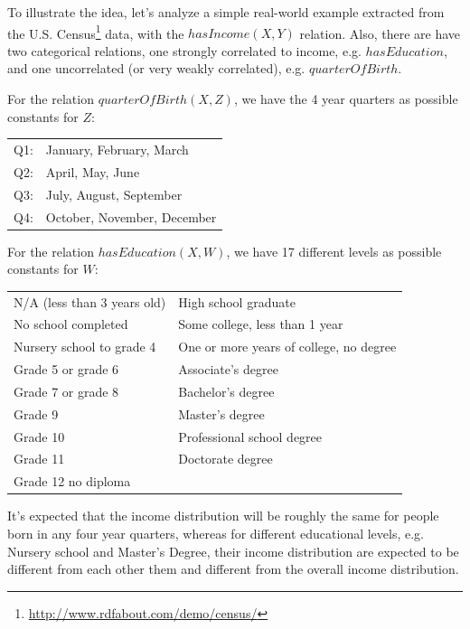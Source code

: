 To illustrate the idea, let's analyze a simple real-world example extracted from the U.S.
Census\footnote{\url{http://www.rdfabout.com/demo/census/}} data, with the $hasIncome(X,Y)$ relation. Also, there are
have two categorical relations, one strongly correlated to income, e.g. $hasEducation$, and one uncorrelated (or very
weakly correlated), e.g. $quarterOfBirth$.

For the relation $quarterOfBirth(X,Z)$, we have the 4 year quarters as possible constants for $Z$:

\begin{center}
  \begin{tabular}{r l}
    Q1:& January, February, March \\
    Q2:& April, May, June \\
    Q3:& July, August, September \\
    Q4:& October, November, December \\
  \end{tabular}
\end{center}

For the relation $hasEducation(X,W)$, we have 17 different levels as possible constants for $W$:

\begin{center}
  \begin{tabular}{l l}
    N/A (less than 3 years old) 	&High school graduate                 		\\
    No school completed			&Some college, less than 1 year			\\
    Nursery school to grade 4   	&One or more years of college, no degree	\\
    Grade 5 or grade 6          	&Associate's degree				\\
    Grade 7 or grade 8          	&Bachelor's degree				\\
    Grade 9                     	&Master's degree				\\
    Grade 10                    	&Professional school degree			\\
    Grade 11                    	&Doctorate degree				\\
    Grade 12 no diploma 		&						\\
  \end{tabular}
\end{center}

It's expected that the income distribution will be roughly the same for people born in any four year quarters, whereas
for different educational levels, e.g. Nursery school and Master's Degree, their income distribution are expected to
be different from each other them and different from the overall income distribution. 

